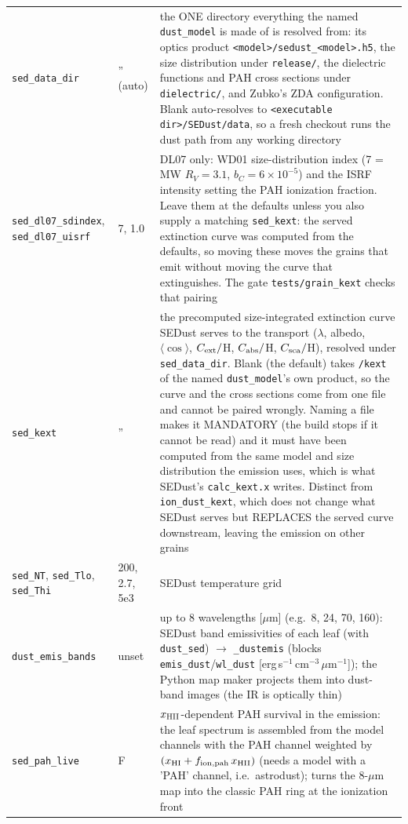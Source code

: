 \documentclass[english,a4paper]{my_memo}
\newcommand{\code}[1]{\texttt{#1}}
\begin{document}
{\begin{longtable}{llp{6.8cm}}
\code{sed\_data\_dir} & '' (auto) & the ONE directory everything the named \code{dust\_model} is made of is resolved from: its optics product \code{<model>/sedust\_<model>.h5}, the size distribution under \code{release/}, the dielectric functions and PAH cross sections under \code{dielectric/}, and Zubko's ZDA configuration.  Blank auto-resolves to \code{<executable dir>/SEDust/data}, so a fresh checkout runs the dust path from any working directory \\
\code{sed\_dl07\_sdindex}, \code{sed\_dl07\_uisrf} & 7, 1.0 & DL07 only: WD01 size-distribution index (7 = MW $R_V = 3.1$, $b_C = 6{\times}10^{-5}$) and the ISRF intensity setting the PAH ionization fraction.  Leave them at the defaults unless you also supply a matching \code{sed\_kext}: the served extinction curve was computed from the defaults, so moving these moves the grains that emit without moving the curve that extinguishes.  The gate \code{tests/grain\_kext} checks that pairing \\
\code{sed\_kext} & '' & the precomputed size-integrated extinction curve SEDust serves to the transport ($\lambda$, albedo, $\langle\cos\rangle$, $C_{\rm ext}/$H, $C_{\rm abs}/$H, $C_{\rm sca}/$H), resolved under \code{sed\_data\_dir}.  Blank (the default) takes \code{/kext} of the named \code{dust\_model}'s own product, so the curve and the cross sections come from one file and cannot be paired wrongly.  Naming a file makes it MANDATORY (the build stops if it cannot be read) and it must have been computed from the same model and size distribution the emission uses, which is what SEDust's \code{calc\_kext.x} writes.  Distinct from \code{ion\_dust\_kext}, which does not change what SEDust serves but REPLACES the served curve downstream, leaving the emission on other grains \\
\code{sed\_NT}, \code{sed\_Tlo}, \code{sed\_Thi} & 200, 2.7, 5e3 & SEDust temperature grid \\
\code{dust\_emis\_bands} & unset & up to 8 wavelengths [$\mu$m] (e.g.\ 8, 24, 70, 160): SEDust band emissivities of each leaf (with \code{dust\_sed}) $\rightarrow$ \code{\_dustemis} (blocks \code{emis\_dust}/\code{wl\_dust} [erg\,s$^{-1}$\,cm$^{-3}$\,$\mu$m$^{-1}$]); the Python map maker projects them into dust-band images (the IR is optically thin) \\
\code{sed\_pah\_live} & F & $x_{\rm HII}$-dependent PAH survival in the emission: the leaf spectrum is assembled from the model channels with the PAH channel weighted by $(x_{\rm HI} + f_{\rm ion,pah}\,x_{\rm HII})$ (needs a model with a 'PAH' channel, i.e.\ astrodust); turns the 8-$\mu$m map into the classic PAH ring at the ionization front \\

\end{longtable}}
\end{document}
